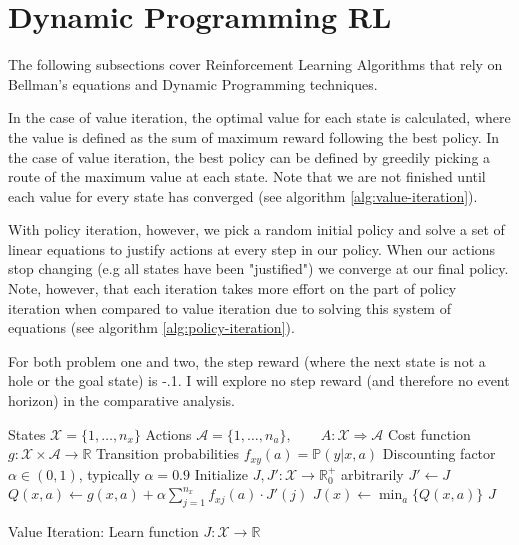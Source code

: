 \documentclass[letter]{article}
\begin{document}
\section{Dynamic Programming RL}
The following subsections cover Reinforcement Learning Algorithms that rely on Bellman's equations and Dynamic Programming techniques.

In the case of value iteration, the optimal value for each state is calculated, where the value is defined as the sum of maximum reward following the best policy. In the case of value iteration, the best policy can be defined by greedily picking a route of the maximum value at each state. Note that we are not finished until each value for every state has converged (see algorithm \ref{alg:value-iteration}).

With policy iteration, however, we pick a random initial policy and solve a set of linear equations to justify actions at every step in our policy. When our actions stop changing (e.g all states have been "justified") we converge at our final policy. Note, however, that each iteration takes more effort on the part of policy iteration when compared to value iteration due to solving this system of equations (see algorithm \ref{alg:policy-iteration}). 

For both problem one and two, the step reward (where the next state is not a hole or the goal state) is -.1. I will explore no step reward (and therefore no event horizon) in the comparative analysis.

\begin{algorithm}[H]
    \begin{algorithmic}
    \Require
    \Statex States $\mathcal{X} = \{1, \dots, n_x\}$
    \Statex Actions $\mathcal{A} = \{1, \dots, n_a\},\qquad A: \mathcal{X} \Rightarrow \mathcal{A}$
    \Statex Cost function $g: \mathcal{X} \times \mathcal{A} \rightarrow \mathbb{R}$
    \Statex Transition probabilities $f_{xy}(a) = \mathbb{P}(y | x, a)$
    \Statex Discounting factor $\alpha \in (0, 1)$, typically $\alpha = 0.9$
        \State Initialize $J, J': \mathcal{X} \rightarrow \mathbb{R}_0^+$ arbitrarily
            \State $J' \gets J$
                    \State $Q(x, a) \gets g(x, a) + \alpha \sum_{j=1}^{n_x} f_{xj}(a) \cdot J'(j)$
                \EndFor
            \EndFor
                \State $J(x) \gets \min_a \{Q(x, a)\}$
            \EndFor
        \EndWhile
        \Return $J$
    \EndProcedure
    \end{algorithmic}
\caption{Value Iteration: Learn function $J: \mathcal{X} \rightarrow \mathbb{R}$}
\label{alg:value-iteration}
\end{algorithm}
\end{document}
